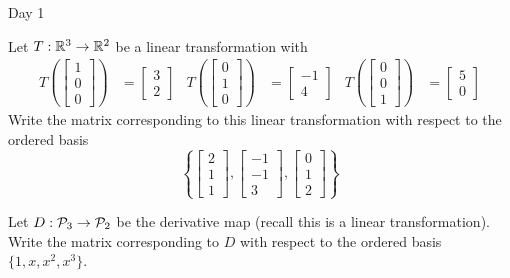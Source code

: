 \begin{applicationActivities}{Day 1}
\begin{activity}{0}
  Let $T: \IR^3 \rightarrow \IR^2$ be a linear transformation with
\begin{align*}
T\left(\begin{bmatrix} 1 \\ 0 \\ 0 \end{bmatrix} \right) &= \begin{bmatrix} 3 \\ 2\end{bmatrix} &
T\left(\begin{bmatrix} 0 \\ 1 \\ 0 \end{bmatrix} \right) &= \begin{bmatrix} -1 \\ 4\end{bmatrix} &
T\left(\begin{bmatrix} 0 \\ 0 \\ 1 \end{bmatrix} \right) &= \begin{bmatrix} 5 \\ 0\end{bmatrix}
\end{align*}
Write the matrix corresponding to this linear transformation with respect to the ordered basis
\[\left\{ \begin{bmatrix} 2 \\ 1 \\ 1 \end{bmatrix} , \begin{bmatrix} -1 \\ -1 \\ 3 \end{bmatrix} , \begin{bmatrix} 0 \\ 1 \\ 2 \end{bmatrix} \right\}\]
\end{activity}

\begin{activity}{0}
Let $D: \P_3 \rightarrow \P_2$ be the derivative map (recall this is a linear transformation).  Write the matrix corresponding to $D$ with respect to the ordered basis $\{1,x,x^2,x^3\}$.
\end{activity}

\end{applicationActivities}
